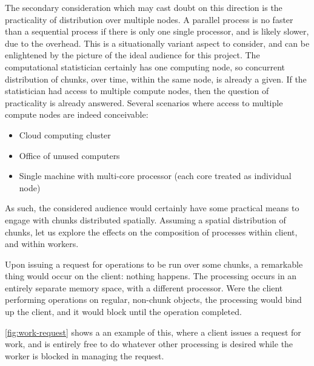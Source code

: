 The secondary consideration which may cast doubt on this direction is the practicality of distribution over multiple nodes.
A parallel process is no faster than a sequential process if there is only one single processor, and is likely slower, due to the overhead.
This is a situationally variant aspect to consider, and can be enlightened by the picture of the ideal audience for this project.
The computational statistician certainly has one computing node, so concurrent distribution of chunks, over time, within the same node, is already a given.
If the statistician had access to multiple compute nodes, then the question of practicality is already answered.
Several scenarios where access to multiple compute nodes are indeed conceivable:

\begin{itemize} \item Cloud computing cluster \item Office of unused computers \item Single machine with multi-core processor (each core treated as individual node) \end{itemize}

As such, the considered audience would certainly have some practical means to engage with chunks distributed spatially.
Assuming a spatial distribution of chunks, let us explore the effects on the composition of processes within client, and within workers.

Upon issuing a request for operations to be run over some chunks, a remarkable thing would occur on the client: nothing happens.
The processing occurs in an entirely separate memory space, with a different processor.
Were the client performing operations on regular, non-chunk objects, the processing would bind up the client, and it would block until the operation completed.

\cref{fig:work-request} shows a an example of this, where a client issues
a request for work, and is entirely free to do whatever other processing
is desired while the worker is blocked in managing the request.


